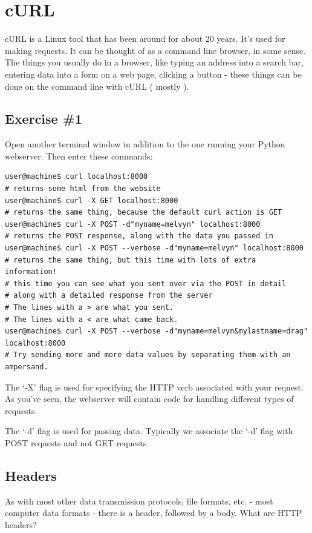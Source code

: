\documentclass[10pt]{article}
\begin{document}
\section{cURL}
cURL is a Linux tool that has been around for about 20 years. It's used for making requests. It can be thought of as a command line browser, in some sense. The things you usually do  in a browser, like typing an address into a search bar, entering data into a form on a web page, clicking a button - these things can be done on the command line with cURL ( mostly ).

\subsection{Exercise \#1}
Open another terminal window in addition to the one running your Python webserver. Then enter these commands:

\begin{lstlisting}
user@machine$ curl localhost:8000
# returns some html from the website
user@machine$ curl -X GET localhost:8000
# returns the same thing, because the default curl action is GET
user@machine$ curl -X POST -d"myname=melvyn" localhost:8000
# returns the POST response, along with the data you passed in
user@machine$ curl -X POST --verbose -d"myname=melvyn" localhost:8000
# returns the same thing, but this time with lots of extra information!
# this time you can see what you sent over via the POST in detail
# along with a detailed response from the server
# The lines with a > are what you sent.
# The lines with a < are what came back.
user@machine$ curl -X POST --verbose -d"myname=melvyn&mylastname=drag" localhost:8000
# Try sending more and more data values by separating them with an ampersand.
\end{lstlisting}

The `-X' flag is used for specifying the HTTP verb associated with your request. As you've seen, the webserver will contain code for handling different types of requests.

The `-d' flag is used for passing data. Typically we associate the `-d' flag with POST requests and not GET requests.

\subsection{Headers}
As with most other data transmission protocols, file formats, etc. - most computer data formats - there is a header, followed by a body. What are HTTP headers?
\end{document}
